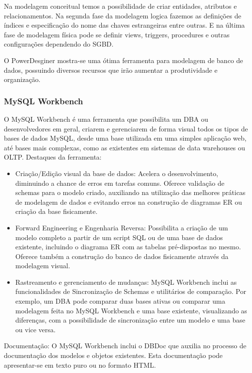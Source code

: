 \documentclass[12pt,a4paper]{article}
\begin{document}
			Na modelagem conceitual temos a possibilidade de criar entidades, atributos e relacionamentos. Na segunda fase da
			modelagem logica fazemos as definições de índices e especificação do nome das chaves estrangeiras entre outras. E na
			última fase de modelagem física pode se definir views, triggers, procedures e outras configurações dependendo do SGBD.

			O PowerDesginer mostra-se uma ótima ferramenta para modelagem de banco de dados, possuindo diversos recursos que
			irão aumentar a produtividade e organização.
			
		\subsubsection{MySQL Workbench}
		
			O MySQL Workbench é uma ferramenta que possibilita um DBA ou desenvolvedores em geral, criarem e gerenciarem de
			forma visual todos os tipos de bases de dados MySQL, desde uma base utilizada em uma simples aplicação web, até bases
			mais complexas, como as existentes em sistemas de data warehouses ou OLTP. Destaques da ferramenta:
			
			\begin{itemize}
			  \item Criação/Edição visual da base de dados: Acelera o desenvolvimento, diminuindo a chance de erros em tarefas
			  comuns. Oferece validação de schemas para o modelo criado, auxiliando na utilização das melhores práticas de
			  modelagem de dados e evitando erros na construção de diagramas ER ou criação da base fisicamente.
			  \item Forward Engineering e Engenharia Reversa: Possibilita a criação de um modelo completo a partir de um script
			  SQL ou de uma base de dados existente, incluindo o diagrama ER com as tabelas pré-dispostas no mesmo. Oferece
			  também a construção do banco de dados fisicamente através da modelagem visual.
			  \item Rastreamento e gerenciamento de mudanças: MySQL Workbench inclui as funcionalidades de Sincronização de
			  Schemas e utilitários de comparação. Por exemplo, um DBA pode comparar duas bases ativas ou comparar uma modelagem
			  feita no MySQL Workbench e uma base existente, visualizando as diferenças, com a possibilidade de sincronização
			  entre um modelo e uma base ou vice versa.
			\end{itemize}

			Documentação: O MySQL Workbench inclui o DBDoc que auxilia no processo de documentação dos modelos e objetos
			existentes. Esta documentação pode apresentar-se em texto puro ou no formato HTML.
			
\end{document}
